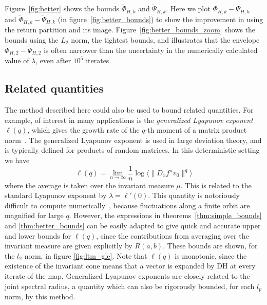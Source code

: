 \documentclass{iopart}
\newcommand{\jitse}[1]{\textcolor{blue}{\bf jitse: #1}}
\begin{document}
Figure~\ref{fig:better} shows the bounds $\tilde{\Phi}_{H,k}$ and $\tilde{\Psi}_{H,k}$. Here we plot $\Phi_{H,k}-\Psi_{H,k}$ and $\tilde{\Phi}_{H,k}-\tilde{\Psi}_{H,k}$ (in figure~\ref{fig:better_bounds}) to show the improvement in using the return partition 
and its image. Figure~\ref{fig:better_bounds_zoom} shows the bounds using 
the $L_2$ norm, the tightest bounds, and illustrates that the envelope $\tilde{\Phi}_{H,2}-\tilde{\Psi}_{H,2}$ is often narrower than the uncertainty in the numerically calculated value of $\lambda$, even after $10^5$ iterates.





\subsection{Related quantities}

The method described here could also be used to bound related quantities. 
For example, of interest in many applications is the {\em generalized Lyapunov exponent} $\ell(q)$, which gives the growth rate of the $q$-th moment of a matrix product norm~\cite{crisanti_generalized_1988}. The generalized Lyapunov exponent is used in large deviation theory, and is typically defined for products of random matrices. In this deterministic setting we have
\begin{equation}\label{eq:gle}
\ell(q) = \lim_{n \to \infty} \frac{1}{n} \log \langle \|D_x f^n v_0 \|^q \rangle
\end{equation}
where the average is taken over the invariant measure $\mu$. This is related to the standard Lyapunov exponent by $\lambda = \ell'(0)$. This quantity is notoriously difficult to compute numerically~\cite{vanneste2010estimating}, because fluctuations along a finite orbit are magnified for large 
$q$. However, the expressions in theorems~\ref{thm:simple_bounds} and \ref{thm:better_bounds} can be easily adapted to give quick and accurate upper and lower bounds for $\ell(q)$, since the contributions from averaging 
over the invariant measure are given explicitly by $R(a,b)$. These bounds 
are shown, for the $l_2$ norm, in figure \ref{fig:ltm_gle}. Note that $\ell(q)$ is monotonic, since the existence of the invariant cone means that 
a vector is expanded by DH at every iterate of the map. Generalized Lyapunov exponents are closely related to the joint spectral radius, a quantity which can also be rigorously bounded, for each $l_p$ norm, by this method. 
\end{document}
